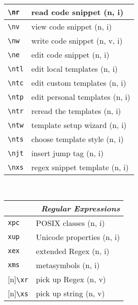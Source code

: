 \documentclass[oneside,10pt,landscape,DIV17]{scrartcl}
\newcommand{\Rep}{{\scriptsize{[n]}}}
\begin{document}
\begin{multicols}{3}
\begin{center}
\begin{tabular}[]{|p{11mm}|p{60mm}|}
\hline \verb'\nr'  & read code snippet         \hfill (n, i)   \\
\hline \verb'\nv'  & view code snippet         \hfill (n, i)   \\
\hline \verb'\nw'  & write code snippet        \hfill (n, v, i)\\
\hline \verb'\ne'  & edit code snippet         \hfill (n, i)   \\
%
\hline \verb'\ntl' & edit local templates      \hfill (n, i)\\
\hline \verb'\ntc' & edit custom templates     \hfill (n, i)\\
\hline \verb'\ntp' & edit personal templates   \hfill (n, i)\\
\hline \verb'\ntr' & reread the templates      \hfill (n, i)\\
\hline \verb'\ntw' & template setup wizard     \hfill (n, i)\\
\hline \verb'\nts' & choose template style     \hfill (n, i)\\
%
\hline \verb'\njt' & insert jump tag           \hfill (n, i)\\
\hline \verb'\nxs' & regex snippet template    \hfill (n, i)\\
\hline
\end{tabular}\\
%
%
\begin{tabular}[]{|p{11mm}|p{60mm}|}
\hline
\multicolumn{2}{|r|}{\textsl{Regular E\textbf{x}pressions}}     \\[1.0ex]
\hline     \verb'xpc' &  POSIX classes                 \hfill (n, i)\\ 
\hline     \verb'xup' &  Unicode properties            \hfill (n, i)\\ 
\hline     \verb'xex' &  extended Regex                \hfill (n, i)\\ 
\hline     \verb'xms' &  metasymbols                   \hfill (n, i)\\ 
%
\hline \Rep\verb'\xr' &  pick up Regex                 \hfill (n, v)\\
\hline \Rep\verb'\xs' &  pick up string                \hfill (n, v)\\

\end{tabular}
\end{center}
\end{multicols}
\end{document}
